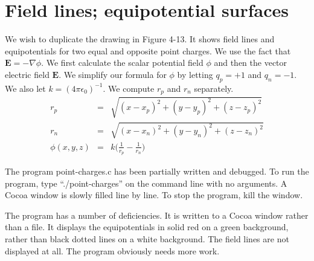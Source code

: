 \section{Field lines; equipotential surfaces}

We wish to duplicate the drawing in Figure 4-13.
It shows field lines and equipotentials for two equal and opposite point charges.
We use the fact that $\boldsymbol{E} = -\nabla\phi$.
We first calculate the scalar potential field $\phi$ 
and then the vector electric field $\boldsymbol{E}$.
We simplify our formula for $\phi$ by letting $q_p = +1$ and $q_n = -1$.
We also let $k = (4\pi\epsilon_0)^{-1}$.
We compute $r_p$ and $r_n$ separately.
\begin{eqnarray}
  r_p &=& \sqrt{(x-x_p)^2 + (y-y_p)^2 + (z-z_p)^2} \nonumber\\
  r_n &=& \sqrt{(x-x_n)^2 + (y-y_n)^2 + (z-z_n)^2} \nonumber\\
  \phi(x,y,z) &=& k \bigg( \frac{1}{r_p} - \frac{1}{r_n} \bigg) \nonumber
\end{eqnarray}

The program \textsf{point-charges.c} has been partially written and debugged.
To run the program, type ``\textsf{./point-charges}'' on the command line with no arguments.
A Cocoa window is slowly filled line by line.
To stop the program, kill the window.

The program has a number of deficiencies.
It is written to a Cocoa window rather than a file.
It displays the equipotentials in solid red on a green background,
rather than black dotted lines on a white background.
The field lines are not displayed at all.
The program obviously needs more work.

